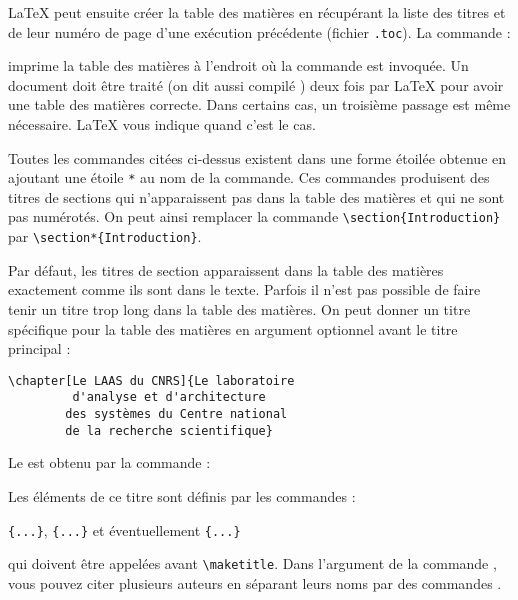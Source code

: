\LaTeX{} peut ensuite créer la table des matières en récupérant la
liste des titres et de leur numéro de page d'une exécution précédente
(fichier \texttt{.toc}). La commande :
\begin{lscommand}
\end{lscommand}
\noindent imprime la table des matières à l'endroit où la commande est
invoquée. Un document doit être traité (on dit aussi \og compilé
\fg{}) deux fois par \LaTeX{} pour avoir une table des matières
correcte. Dans certains cas, un troisième passage est même
nécessaire. \LaTeX{} vous indique quand c'est le cas.

Toutes les commandes citées ci-dessus existent dans une forme
\og étoilée \fg{} obtenue en ajoutant une étoile \verb|*| au nom de la
commande. Ces commandes produisent des titres de sections qui
n'apparaissent pas dans la table des matières et qui ne sont pas
numérotés. On peut ainsi remplacer la commande
\verb|\section{Introduction}| par
\verb|\section*{Introduction}|.

Par défaut, les titres de section apparaissent dans la table des
matières exactement comme ils sont dans le texte. Parfois il n'est pas
possible de faire tenir un titre trop long dans la table des
matières. On peut donner un titre spécifique pour la table des
matières en argument optionnel avant le titre principal :
\begin{code}
\verb|\chapter[Le LAAS du CNRS]{Le laboratoire|\\
\verb|         d'analyse et d'architecture|\\
\verb|        des systèmes du Centre national|\\
\verb|        de la recherche scientifique}|
\end{code}

Le  est obtenu par la commande :
\begin{lscommand}
\end{lscommand}
Les éléments de ce titre sont définis par les commandes :
\begin{lscommand}
\verb|{...}|, \verb|{...}|
et éventuellement \verb|{...}|
\end{lscommand}
\noindent qui doivent être appelées avant \verb|\maketitle|. Dans
l'argument de la commande , vous pouvez citer plusieurs
auteurs en séparant leurs noms par des commandes .

